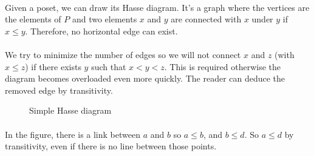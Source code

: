 \paragraph{}
Given a poset, we can draw its Hasse diagram. It's a graph where the vertices are the elements of $P$ and two elements $x$ and $y$ are connected with $x$ under $y$ if $x \le y$. Therefore, no horizontal edge can exist.

\paragraph{}
We try to minimize the number of edges so we will not connect $x$ and $z$ (with $x \le z$) if there exists $y$ such that $x < y < z$. This is required otherwise the diagram becomes overloaded even more quickly. The reader can deduce the removed edge by transitivity.

\begin{figure}[H]
  \begin{center}
    \caption{Simple Hasse diagram}
  \end{center}
\end{figure}

\paragraph{}
In the figure, there is a link between $a$ and $b$ so $a \le b$, and $b \le d$. So $a \le d$ by transitivity, even if there is no line between those points.

